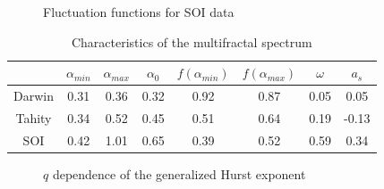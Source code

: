 \documentclass[onecolumn, preprint,aps,amsmath, amssymb, superscriptaddress]{revtex4}
\begin{document}
\begin{figure}
\caption{Fluctuation functions for SOI data}
\label{fig:mfdfa_soi}
\end{figure}

\begin{table}[t]
\begin{center}
\begin{tabular}{ c  c  c  c  c  c  c  c }
\hline

   & $\alpha_{min}$  & $\alpha_{max}$ & $\alpha_0$ & $f(\alpha_{min})$ & $f(\alpha_{max})$ & $\omega$& $a_s$ \\ \hline
Darwin   & 0.31  & 0.36  & 0.32  & 0.92 &  0.87 &  0.05 &  0.05 \\
Tahity     & 0.34  & 0.52  & 0.45  & 0.51 &  0.64 &  0.19 &  -0.13 \\
SOI     & 0.42  & 1.01  & 0.65  & 0.39 &  0.52 &  0.59 &  0.34 \\
\hline
\end{tabular}
\caption{Characteristics of the multifractal spectrum}
\label{tab:mfdfa}
\end{center}
\end{table}


\begin{figure}
\caption{$q$ dependence of the generalized Hurst exponent}
\label{fig:H}
\end{figure}
\end{document}
